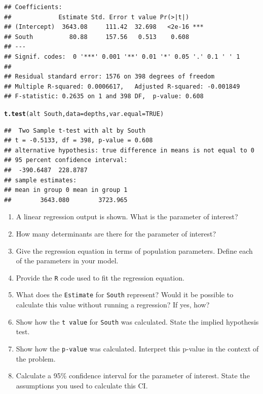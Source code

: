 \documentclass[landscape,twocolumn,letterpaper,9pt,reqno]{article}\usepackage[]{graphicx}\usepackage[]{color}
\newcommand{\hlnum}[1]{\textcolor[rgb]{0.686,0.059,0.569}{#1}}%
\newcommand{\hlopt}[1]{\textcolor[rgb]{0,0,0}{#1}}%
\newcommand{\hlstd}[1]{\textcolor[rgb]{0.345,0.345,0.345}{#1}}%
\newcommand{\hlkwc}[1]{\textcolor[rgb]{0.333,0.667,0.333}{#1}}%
\newcommand{\hlkwd}[1]{\textcolor[rgb]{0.737,0.353,0.396}{\textbf{#1}}}%
\newenvironment{knitrout}{}{} %
\newcommand{\compresslist}{ %
	\setlength{\itemsep}{1pt}
	\setlength{\parskip}{0pt}
	\setlength{\parsep}{0pt}
}
\begin{document}
\begin{knitrout}\footnotesize
{}\color{fgcolor}
\begin{verbatim}
## Coefficients:
##             Estimate Std. Error t value Pr(>|t|)    
## (Intercept)  3643.08     111.42  32.698   <2e-16 ***
## South          80.88     157.56   0.513    0.608    
## ---
## Signif. codes:  0 '***' 0.001 '**' 0.01 '*' 0.05 '.' 0.1 ' ' 1
## 
## Residual standard error: 1576 on 398 degrees of freedom
## Multiple R-squared: 0.0006617,	Adjusted R-squared: -0.001849 
## F-statistic: 0.2635 on 1 and 398 DF,  p-value: 0.608
\end{verbatim}
\begin{alltt}
\hlkwd{t.test}\hlstd{(alt} \hlopt{~} \hlstd{South,} \hlkwc{data} \hlstd{= depths,} \hlkwc{var.equal} \hlstd{=} \hlnum{TRUE}\hlstd{)}
\end{alltt}
\begin{verbatim}
##  Two Sample t-test with alt by South 
## t = -0.5133, df = 398, p-value = 0.608
## alternative hypothesis: true difference in means is not equal to 0 
## 95 percent confidence interval:
##  -390.6487  228.8787 
## sample estimates:
## mean in group 0 mean in group 1 
##        3643.080        3723.965
\end{verbatim}

\end{knitrout}


\begin{enumerate}\compresslist
	\item A linear regression output is shown. What is the parameter of interest?
	\item How many determinants are there for the parameter of interest?
	\item Give the regression equation in terms of population parameters. Define each of the parameters in your model.
	\item Provide the \texttt{R} code used to fit the regression equation.
	\item What does the \texttt{Estimate} for \texttt{South} represent? Would it be possible to calculate this value without running a regression? If yes, how?
	\item Show how the \texttt{t value} for \texttt{South} was calculated. State the implied hypothesis test. 
	\item Show how the \texttt{p-value} was calculated. Interpret this p-value in the context of the problem. 
	\item Calculate a 95\% confidence interval for the parameter of interest. State the assumptions you used to calculate this CI.
\end{enumerate}
\end{document}
